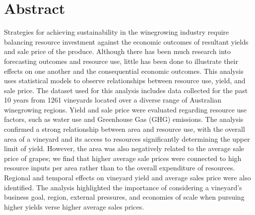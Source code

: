 \documentclass[10pt,letterpaper]{article}
\begin{document}
\section*{Abstract}

Strategies for achieving sustainability in the winegrowing industry require balancing resource investment against the economic outcomes of resultant yields and sale price of the produce. Although there has been much research into forecasting outcomes and resource use, little has been done to illustrate their effects on one another and the consequential economic outcomes. This analysis uses statistical models to observe relationships between resource use, yield, and sale price. The dataset used for this analysis includes data collected for the past 10 years from 1261 vineyards located over a diverse range of Australian winegrowing regions. Yield and sale price were evaluated regarding resource use factors, such as water use and Greenhouse Gas (GHG) emissions. The analysis confirmed a strong relationship between area and resource use, with the overall area of a vineyard and its access to resources significantly determining the upper limit of yield. However, the area was also negatively related to the average sale price of grapes; we find that higher average sale prices were connected to high resource inputs per area rather than to the overall expenditure of resources. Regional and temporal effects on vineyard yield and average sales price were also identified. The analysis highlighted the importance of considering a vineyard's business goal, region, external pressures, and economies of scale when pursuing higher yields verse higher average sales prices.

\end{document}
